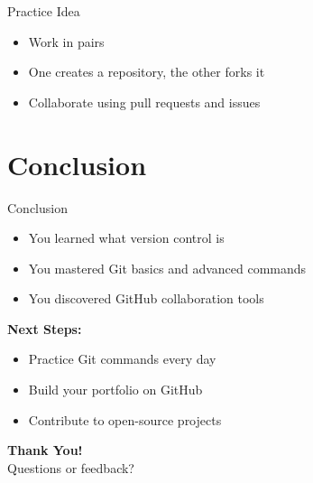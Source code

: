 \documentclass[aspectratio=169]{beamer}
\begin{document}
\begin{frame}{Practice Idea}
\begin{itemize}
  \item Work in pairs
  \item One creates a repository, the other forks it
  \item Collaborate using pull requests and issues
\end{itemize}
\end{frame}

\section{Conclusion}

\begin{frame}{Conclusion}
\begin{itemize}
  \item You learned what version control is
  \item You mastered Git basics and advanced commands
  \item You discovered GitHub collaboration tools
\end{itemize}

\bigskip
\textbf{Next Steps:}
\begin{itemize}
  \item Practice Git commands every day
  \item Build your portfolio on GitHub
  \item Contribute to open-source projects
\end{itemize}
\end{frame}

\begin{frame}
  \centering
  \Huge{\textbf{Thank You!}}\\[1em]
  \large{Questions or feedback?}
\end{frame}
\end{document}

